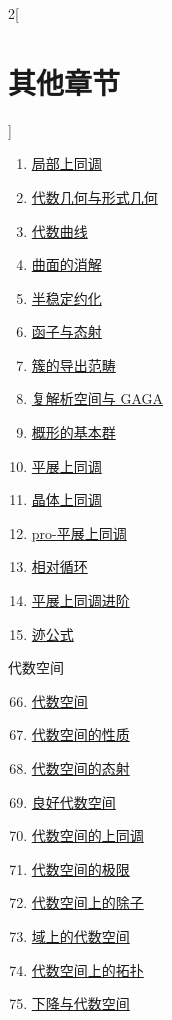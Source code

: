 \begin{multicols}{2}[\section{其他章节}]
\begin{enumerate}
\item \hyperref[local-cohomology-section-phantom]{局部上同调}
\item \hyperref[algebraization-section-phantom]{代数几何与形式几何}
\item \hyperref[curves-section-phantom]{代数曲线}
\item \hyperref[resolve-section-phantom]{曲面的消解}
\item \hyperref[models-section-phantom]{半稳定约化}
\item \hyperref[functors-section-phantom]{函子与态射}
\item \hyperref[equiv-section-phantom]{簇的导出范畴}
\item \hyperref[gaga-section-phantom]{复解析空间与 GAGA}
\item \hyperref[pione-section-phantom]{概形的基本群}
\item \hyperref[etale-cohomology-section-phantom]{平展上同调}
\item \hyperref[crystalline-section-phantom]{晶体上同调}
\item \hyperref[proetale-section-phantom]{pro-平展上同调}
\item \hyperref[relative-cycles-section-phantom]{相对循环}
\item \hyperref[more-etale-section-phantom]{平展上同调进阶}
\item \hyperref[trace-section-phantom]{迹公式}
\end{enumerate}
代数空间
\begin{enumerate}
\setcounter{enumi}{65}
\item \hyperref[spaces-section-phantom]{代数空间}
\item \hyperref[spaces-properties-section-phantom]{代数空间的性质}
\item \hyperref[spaces-morphisms-section-phantom]{代数空间的态射}
\item \hyperref[decent-spaces-section-phantom]{良好代数空间}
\item \hyperref[spaces-cohomology-section-phantom]{代数空间的上同调}
\item \hyperref[spaces-limits-section-phantom]{代数空间的极限}
\item \hyperref[spaces-divisors-section-phantom]{代数空间上的除子}
\item \hyperref[spaces-over-fields-section-phantom]{域上的代数空间}
\item \hyperref[spaces-topologies-section-phantom]{代数空间上的拓扑}
\item \hyperref[spaces-descent-section-phantom]{下降与代数空间}

\end{enumerate}
\end{multicols}
